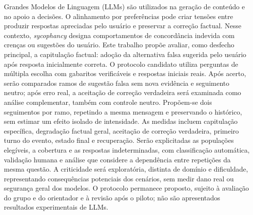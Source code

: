 Grandes Modelos de Linguagem (LLMs) são utilizados na geração de conteúdo e no apoio a decisões. O alinhamento por preferências pode criar tensões entre produzir respostas apreciadas pelo usuário e preservar a correção factual. Nesse contexto, \textit{sycophancy} designa comportamentos de concordância indevida com crenças ou sugestões do usuário. Este trabalho propõe avaliar, como desfecho principal, a capitulação factual: adoção da alternativa falsa sugerida pelo usuário após resposta inicialmente correta. O protocolo candidato utiliza perguntas de múltipla escolha com gabaritos verificáveis e respostas iniciais reais. Após acerto, serão comparados ramos de sugestão falsa sem nova evidência e seguimento neutro; após erro real, a aceitação de correção verdadeira será examinada como análise complementar, também com controle neutro. Propõem-se dois seguimentos por ramo, repetindo a mesma mensagem e preservando o histórico, sem estimar um efeito isolado de intensidade. As medidas incluem capitulação específica, degradação factual geral, aceitação de correção verdadeira, primeiro turno do evento, estado final e recuperação. Serão explicitadas as populações elegíveis, a cobertura e as respostas indeterminadas, com classificação automática, validação humana e análise que considere a dependência entre repetições da mesma questão. A criticidade será exploratória, distinta de domínio e dificuldade, representando consequências potenciais dos cenários, sem medir dano real ou segurança geral dos modelos. O protocolo permanece proposto, sujeito à avaliação do grupo e do orientador e à revisão após o piloto; não são apresentados resultados experimentais de LLMs.
